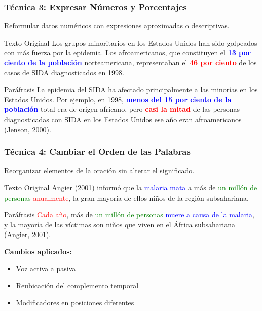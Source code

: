 \documentclass[aspectratio=169]{beamer}
\begin{document}
\begin{frame}
	\frametitle{Técnica 3: Expresar Números y Porcentajes}
	
	Reformular datos numéricos con expresiones aproximadas o descriptivas.
	
	\vspace{0.5em}
	
	\begin{exampleblock}{Texto Original}
		\small
		Los grupos minoritarios en los Estados Unidos han sido golpeados con más fuerza por la epidemia. Los afroamericanos, que constituyen el \textcolor{blue}{\textbf{13 por ciento de la población}} norteamericana, representaban el \textcolor{red}{\textbf{46 por ciento}} de los casos de SIDA diagnosticados en 1998.
	\end{exampleblock}
	
	\vspace{0.5em}
	
	\begin{exampleblock}{Paráfrasis}
		\small
		La epidemia del SIDA ha afectado principalmente a las minorías en los Estados Unidos. Por ejemplo, en 1998, \textcolor{blue}{\textbf{menos del 15 por ciento de la población}} total era de origen africano, pero \textcolor{red}{\textbf{casi la mitad}} de las personas diagnosticadas con SIDA en los Estados Unidos ese año eran afroamericanos (Jenson, 2000).
	\end{exampleblock}
\end{frame}

\begin{frame}
	\frametitle{Técnica 4: Cambiar el Orden de las Palabras}
	
	Reorganizar elementos de la oración sin alterar el significado.
	
	\vspace{0.5em}
	
	\begin{exampleblock}{Texto Original}
		\small
		Angier (2001) informó que la \textcolor{blue}{malaria mata} a más de \textcolor{green}{un millón de personas} \textcolor{red}{anualmente}, la gran mayoría de ellos niños de la región subsahariana.
	\end{exampleblock}
	
	\vspace{0.5em}
	
	\begin{exampleblock}{Paráfrasis}
		\small
		\textcolor{red}{Cada año}, más de \textcolor{green}{un millón de personas} \textcolor{blue}{muere a causa de la malaria}, y la mayoría de las víctimas son niños que viven en el África subsahariana (Angier, 2001).
	\end{exampleblock}
	
	\vspace{0.5em}
	
	\textbf{Cambios aplicados:}
	\begin{itemize}
		\item Voz activa a pasiva
		\item Reubicación del complemento temporal
		\item Modificadores en posiciones diferentes
	\end{itemize}
\end{frame}
\end{document}
